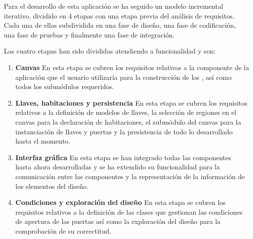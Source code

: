 Para el desarrollo de esta aplicación se ha seguido un modelo incremental iterativo, dividido en 4 etapas con una etapa previa del análisis de requisitos. Cada una de ellas subdividida en una fase de diseño, una fase de codificación, una fase de pruebas y finalmente una fase de integración.

Las cuatro etapas han sido divididas atendiendo a funcionalidad y son:
\begin{enumerate}
	\item \textbf{Canvas} En esta etapa se cubren los requisitos relativos a la componente de la aplicación que el usuario utilizaría para la construcción de los , así como todos los submódulos requeridos.
	\item \textbf{Llaves, habitaciones y persistencia} En esta etapa se cubren los requisitos relativos a la definición de modelos de llaves, la selección de regiones en el canvas para la declaración de habitaciones, el submódulo del canvas para la instanciación de llaves y puertas y la presistencia de todo lo desarrollado hasta el momento.
	\item \textbf{Interfaz gráfica} En esta etapa se han integrado todas las componentes hasta ahora desarrolladas y se ha extendido su funcionalidad para la comunicación entre las componentes y la representación de la información de los elementos del diseño.
	\item \textbf{Condiciones y exploración del diseño} En esta etapa se cubren los requisitos relativos a la definición de las clases que gestionan las condiciones de apertura de las puertas así como la exploración del diseño para la comprobación de su correctitud.
\end{enumerate}